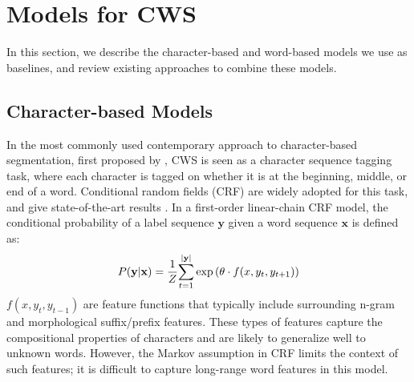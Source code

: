 \section{Models for CWS}

In this section, we describe the character-based and word-based models we use as baselines, and review existing approaches to combine these models.


\subsection{Character-based Models}
In the most commonly used contemporary approach to character-based segmentation, first proposed by \cite{Xue:2003:IJCLCLP}, CWS is seen as a character sequence tagging task, where each character is tagged on whether it is at the beginning, middle, or end of a word. Conditional random fields (CRF) \cite{Lafferty:2001:ICML} are widely adopted for this task, and give state-of-the-art results \cite{Tseng:2005:SIGHAN}. In a first-order linear-chain CRF model, the conditional probability of a label sequence $\mathbf{y}$ given a word sequence $\mathbf{x}$ is defined as:
\begin{align*}\vspace{-10em}
P(\mathbf{y} | \mathbf{x}) = \frac{1}{Z}{ \sum\limits_{t=1}^{|\mathbf{y}|}{ \exp\left( \theta \cdot {f}(x, y_t, y_{t+1}) \right) }}
\vspace{-10em}
\end{align*}
\noindent $f(x, y_{t}, y_{t-1})$ are feature functions that typically include surrounding n-gram and morphological suffix/prefix features. These types of features capture the compositional properties of characters and are likely to generalize well to unknown words.  
However, the Markov assumption in CRF limits the context of such features; it is difficult to capture long-range word features in this model. 

